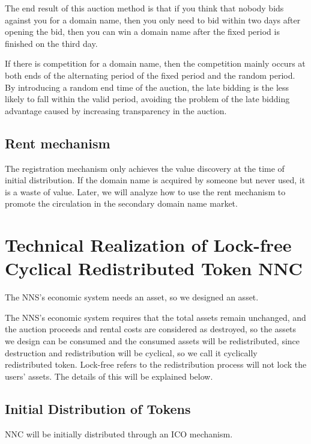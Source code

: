 \documentclass[letterpaper,10pt,english]{sphinxmanual}
\begin{document}
The end result of this auction method is that if you think that nobody bids against you for a domain name,
then you only need to bid within two days after opening the bid,
then you can win a domain name after the fixed period is finished on the third day.

If there is competition for a domain name, then the competition mainly occurs
at both ends of the alternating period of the fixed period and the random period.
By introducing a random end time of the auction, the late bidding is the less likely to fall within the valid period,
avoiding the problem of the late bidding advantage caused by increasing transparency in the auction.


\subsection{Rent mechanism}
\label{\detokenize{nns_protocol:rent-mechanism}}
The registration mechanism only achieves the value discovery at the time of initial distribution.
If the domain name is acquired by someone but never used, it is a waste of value.
Later, we will analyze how to use the rent mechanism to promote the circulation in the secondary domain name market.


\section{Technical Realization of Lock-free Cyclical Redistributed Token NNC}
\label{\detokenize{nns_protocol:technical-realization-of-lock-free-cyclical-redistributed-token-nnc}}
The NNS’s economic system needs an asset, so we designed an asset.

The NNS’s economic system requires that the total assets remain unchanged, and the auction proceeds and rental costs are considered as destroyed,
so the assets we design can be consumed and the consumed assets will be redistributed, since destruction and redistribution will be cyclical,
so we call it cyclically redistributed token. Lock-free refers to the redistribution process will not lock the users’ assets.
The details of this will be explained below.


\subsection{Initial Distribution of Tokens}
\label{\detokenize{nns_protocol:initial-distribution-of-tokens}}
NNC will be initially distributed through an ICO mechanism.
\end{document}

